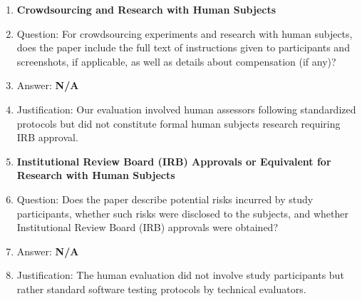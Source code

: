 \documentclass{article}
\begin{document}
\begin{enumerate}
\item {\bf Crowdsourcing and Research with Human Subjects}
    \item[] Question: For crowdsourcing experiments and research with human subjects, does the paper include the full text of instructions given to participants and screenshots, if applicable, as well as details about compensation (if any)?
    \item[] Answer: \textbf{N/A}
    \item[] Justification: Our evaluation involved human assessors following standardized protocols but did not constitute formal human subjects research requiring IRB approval.

\item {\bf Institutional Review Board (IRB) Approvals or Equivalent for Research with Human Subjects}
    \item[] Question: Does the paper describe potential risks incurred by study participants, whether such risks were disclosed to the subjects, and whether Institutional Review Board (IRB) approvals were obtained?
    \item[] Answer: \textbf{N/A}
    \item[] Justification: The human evaluation did not involve study participants but rather standard software testing protocols by technical evaluators.

\end{enumerate}
\end{document}
